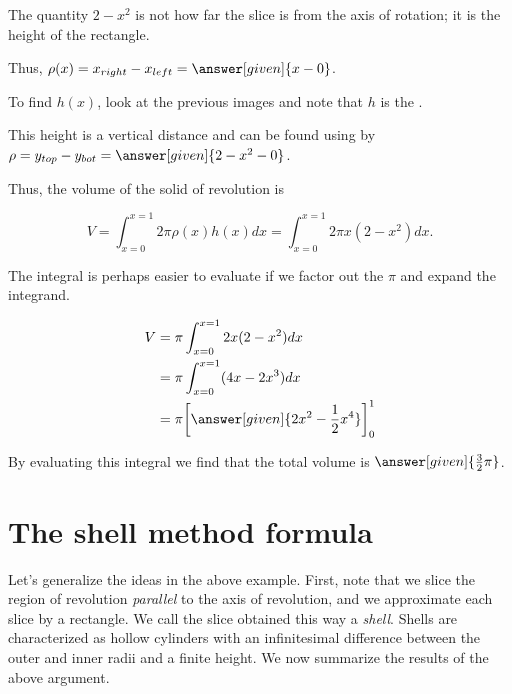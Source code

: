 \documentclass{ximera}
\begin{document}
\begin{model}
\begin{feedback}
\begin{image}
            \end{image}     

The quantity $2-x^2$ is not how far the slice is from the axis of rotation; it is the height of the rectangle.

 \end{feedback}

Thus, $\rho(x) = x_{right}-x_{left} = \answer[given]{x-0}$.

To find $h(x)$, look at the previous images and note that $h$ is the .

This height is a vertical distance and can be found using by $\rho = y_{top}-y_{bot} = \answer[given]{2-x^2-0}$.


Thus, the volume of the solid of revolution is

\[
V = \int_{x=0}^{x=1} 2 \pi \rho(x) h(x) dx = \int_{x=0}^{x=1} 2 \pi x(2-x^2) dx.
\]

The integral is perhaps easier to evaluate if we factor out the $\pi$ and expand the integrand.

\begin{align*}
V &= \pi \int_{x=0}^{x=1} 2x(2-x^2) dx \\
&= \pi \int_{x=0}^{x=1} (4x-2x^3) dx \\
&= \pi \bigg[\answer[given]{2x^2-\frac{1}{2}x^4}\bigg]_0^1
\end{align*}

By evaluating this integral we find that the total volume is $\answer[given]{\frac{3}{2}\pi}$.   
\end{model}

\section{The shell method formula}
Let's generalize the ideas in the above example.  First, note that we slice the region of revolution \emph{parallel} to the axis of revolution, and we approximate each slice by a rectangle.  We call the slice obtained this way a \emph{shell}.  Shells are characterized as hollow cylinders with an infinitesimal difference between the outer and inner radii and a finite height.  We now summarize the results of the above argument.
\end{document}
